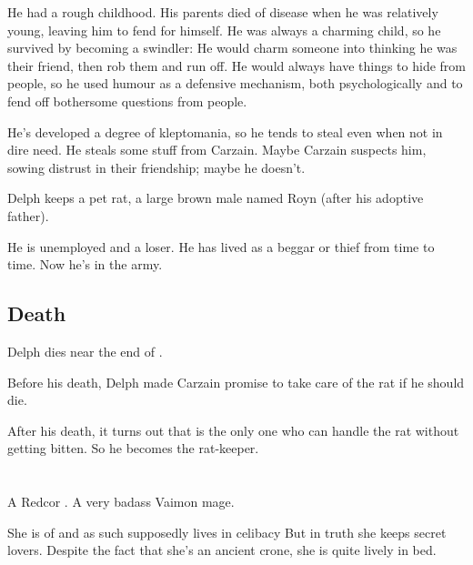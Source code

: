 He had a rough childhood. His parents died of disease when he was relatively young, leaving him to fend for himself. He was always a charming child, so he survived by becoming a swindler: He would charm someone into thinking he was their friend, then rob them and run off. He would always have things to hide from people, so he used humour as a defensive mechanism, both psychologically and to fend off bothersome questions from people. 

He's developed a degree of kleptomania, so he tends to steal even when not in dire need. He steals some stuff from Carzain. Maybe Carzain suspects him, sowing distrust in their friendship; maybe he doesn't. 

Delph keeps a pet rat, a large brown male named Royn (after his adoptive father). 

He is unemployed and a loser. 
He has lived as a beggar or thief from time to time. 
Now he's in the army. 







\subsection{Death}
Delph dies near the end of \emph{\TwilightAngelRemember{}}. 

Before his death, Delph made Carzain promise to take care of the rat if he should die. 

After his death, it turns out that  is the only one who can handle the rat without getting bitten. So he becomes the rat-keeper. 















\section{\Dominice}
A Redcor \Matriarch. A very badass Vaimon mage. 

She is of \theTulipFaction{} and as such supposedly lives in celibacy
But in truth she keeps secret lovers. 
Despite the fact that she's an ancient crone, she is quite lively in bed.















